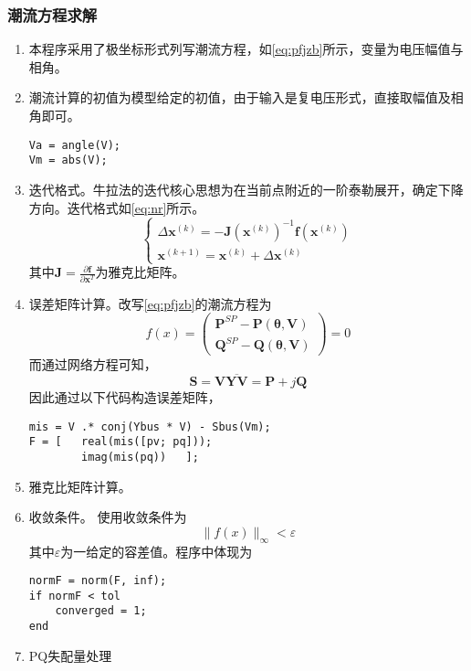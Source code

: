 \documentclass[a4paper,12pt]{article}
\newcommand{\vect}[1]{\boldsymbol{#1}}
\begin{document}
    \subsubsection{潮流方程求解}
    \begin{enumerate}
      \item 本程序采用了极坐标形式列写潮流方程，如\cref{eq:pfjzb}所示，变量为电压幅值与相角。
      \item 潮流计算的初值为模型给定的初值，由于输入是复电压形式，直接取幅值及相角即可。
      \begin{lstlisting}[style=Matlab-editor,basicstyle=\mlttfamily]
Va = angle(V);
Vm = abs(V);
      \end{lstlisting}
      \item 迭代格式。牛拉法的迭代核心思想为在当前点附近的一阶泰勒展开，确定下降方向。迭代格式如\cref{eq:nr}所示。
\begin{equation}
  \label{eq:nr}
  \begin{cases}
    \Delta \vect{x}^{(k)} = -\vect{J}(\vect{x}^{(k)})^{-1}\vect{f}(\vect{x}^{(k)})\\
    \vect{x}^{(k+1)}=\vect{x}^{(k)}+\Delta \vect{x}^{(k)}
  \end{cases}
\end{equation}
      其中$\vect{J}=\frac{\partial \vect{f}}{\partial \vect{x}^T}$为雅克比矩阵。
      \item 误差矩阵计算。改写\cref{eq:pfjzb}的潮流方程为
      \begin{equation}
        f(x) = \begin{pmatrix}
          \vect{P}^{SP}-\vect{P}(\vect{\theta},\vect{V})\\
          \vect{Q}^{SP}-\vect{Q}(\vect{\theta},\vect{V})
      \end{pmatrix} = 0
      \end{equation}
      而通过网络方程可知，
      \begin{equation}
        \vect{S}=\vect{V}\overline{\vect{YV}}=\vect{P}+j\vect{Q}
      \end{equation}
      因此通过以下代码构造误差矩阵，
      \begin{lstlisting}[style=Matlab-editor,basicstyle=\mlttfamily]
mis = V .* conj(Ybus * V) - Sbus(Vm);
F = [   real(mis([pv; pq]));
        imag(mis(pq))   ];
      \end{lstlisting}
      \item 雅克比矩阵计算。
      \item 收敛条件。
      使用收敛条件为
      \begin{equation}
        \parallel f(x) \parallel_\infty < \varepsilon
      \end{equation}
      其中$\varepsilon$为一给定的容差值。程序中体现为
      \begin{lstlisting}[style=Matlab-editor,basicstyle=\mlttfamily]
normF = norm(F, inf);
if normF < tol
    converged = 1;
end
      \end{lstlisting}
      \item PQ失配量处理
    \end{enumerate}
\end{document}
